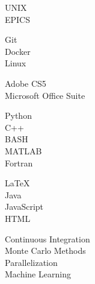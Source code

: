 
\begin{minipage}[t]{0.2\textwidth}
  \flushleft
\end{minipage}
\begin{minipage}[t]{0.8\textwidth}
  {
    \begin{minipage}[t]{0.30\textwidth}
      UNIX\\
      EPICS
    \end{minipage}
    \begin{minipage}[t]{0.30\textwidth}
      Git\\
      Docker\\
      Linux
    \end{minipage}
    \begin{minipage}[t]{0.30\textwidth}
      Adobe CS5\\
      Microsoft Office Suite
    \end{minipage}
  }
  
  \vspace*{8pt}

  {
    \begin{minipage}[t]{0.30\textwidth}
      Python\\
      C++\\
      BASH\\
      MATLAB\\
      Fortran
    \end{minipage}
    \begin{minipage}[t]{0.30\textwidth}
      \LaTeX\\
      Java\\
      JavaScript\\
      HTML
    \end{minipage}
    \begin{minipage}[t]{0.30\textwidth}
      Continuous Integration\\
      Monte Carlo Methods\\
      Parallelization\\
      Machine Learning
    \end{minipage}
  }
  
  \vspace*{8pt}


\end{minipage}
